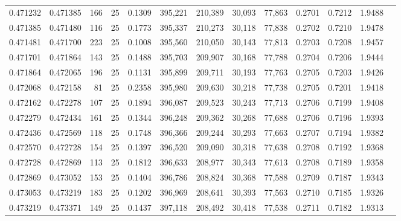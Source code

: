 \begin{tabular}{rrrrrrrrrrrrr}
0.471232 & 0.471385 &   166 &  25 &                                     0.1309 & 395,221 & 210,389 &  30,093 &  77,863 & 0.2701 & 0.7212 & 1.9488 \\
0.471385 & 0.471480 &   116 &  25 &                                     0.1773 & 395,337 & 210,273 &  30,118 &  77,838 & 0.2702 & 0.7210 & 1.9478 \\
0.471481 & 0.471700 &   223 &  25 &                                     0.1008 & 395,560 & 210,050 &  30,143 &  77,813 & 0.2703 & 0.7208 & 1.9457 \\
0.471701 & 0.471864 &   143 &  25 &                                     0.1488 & 395,703 & 209,907 &  30,168 &  77,788 & 0.2704 & 0.7206 & 1.9444 \\
0.471864 & 0.472065 &   196 &  25 &                                     0.1131 & 395,899 & 209,711 &  30,193 &  77,763 & 0.2705 & 0.7203 & 1.9426 \\
0.472068 & 0.472158 &    81 &  25 &                                     0.2358 & 395,980 & 209,630 &  30,218 &  77,738 & 0.2705 & 0.7201 & 1.9418 \\
0.472162 & 0.472278 &   107 &  25 &                                     0.1894 & 396,087 & 209,523 &  30,243 &  77,713 & 0.2706 & 0.7199 & 1.9408 \\
0.472279 & 0.472434 &   161 &  25 &                                     0.1344 & 396,248 & 209,362 &  30,268 &  77,688 & 0.2706 & 0.7196 & 1.9393 \\
0.472436 & 0.472569 &   118 &  25 &                                     0.1748 & 396,366 & 209,244 &  30,293 &  77,663 & 0.2707 & 0.7194 & 1.9382 \\
0.472570 & 0.472728 &   154 &  25 &                                     0.1397 & 396,520 & 209,090 &  30,318 &  77,638 & 0.2708 & 0.7192 & 1.9368 \\
0.472728 & 0.472869 &   113 &  25 &                                     0.1812 & 396,633 & 208,977 &  30,343 &  77,613 & 0.2708 & 0.7189 & 1.9358 \\
0.472869 & 0.473052 &   153 &  25 &                                     0.1404 & 396,786 & 208,824 &  30,368 &  77,588 & 0.2709 & 0.7187 & 1.9343 \\
0.473053 & 0.473219 &   183 &  25 &                                     0.1202 & 396,969 & 208,641 &  30,393 &  77,563 & 0.2710 & 0.7185 & 1.9326 \\
0.473219 & 0.473371 &   149 &  25 &                                     0.1437 & 397,118 & 208,492 &  30,418 &  77,538 & 0.2711 & 0.7182 & 1.9313 \\

\end{tabular}
